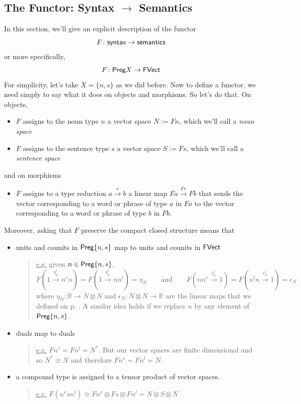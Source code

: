 \documentclass{tufte-handout-tai}
\newcommand{\cat}[1]{{\normalfont\textsf{#1}}}
\theoremstyle{plain}
\theoremstyle{definition}
\theoremstyle{remark}
\begin{document}
\subsection*{The Functor: Syntax $\to$ Semantics} 
In this section, we'll give an explicit description of the functor
\[F\colon \cat{syntax}\to\cat{semantics}\]
or more specifically,
\[F\colon \cat{Preg}X\to\cat{FVect}\]
For simplicity, let's take $X=\{n,s\}$ as we did before. Now to define a functor, we need simply to say what it does on objects and morphisms. So let's do that. On objects, 
		\begin{itemize}
			\item $F$ assigns to the noun type $n$ a vector space $N:=Fn$, which we'll call a \textit{noun space}
			\item $F$ assigns to the sentence type $s$ a vector space $S:=Fs$, which we'll call a \textit{sentence space}
		\end{itemize}
and on morphisms
		\begin{itemize}
			\item $F$ assigns to a type reduction $a\overset{r}{\longrightarrow} b$ a linear map $Fa\overset{Fr}{\longrightarrow}Fb$ that sends the vector corresponding to a word or phrase of type $a$ in $Fa$ to the vector corresponding to a word or phrase of type $b$ in $Fb$.
		\end{itemize}
Moreover, asking that $F$ preserve the compact closed structure means that
	\begin{itemize}
		\item units and counits in $\cat{Preg}\{n,s\}$ map to units and counits in $\cat{FVect}$
			
			\begin{quote}
				\underline{e.g.} given $n\in \cat{Preg}\{n,s\}$, 
				\[F(1\overset{\eta_n^r}{\longrightarrow} n^rn)=F(1\overset{\eta_n^l}{\longrightarrow} nn^l)=\eta_N 
				\qquad\text{and}\qquad
				F(nn^r\overset{\epsilon_n^r}{\longrightarrow}1)=F(n^ln\overset{\epsilon_n^l}{\longrightarrow}1)=\epsilon_N 
				\]
				where $\eta_N\colon \mathbb{R}\to N\otimes N$ and $\epsilon_N\colon N\otimes N\to \mathbb{R}$ are the linear maps that we defined on p. \pageref{lis:ucounit}. A similar idea holds if we replace $n$ by any element of $\cat{Preg}\{n,s\}$.
			\end{quote}
			
		\item duals map to duals
			
			\begin{quote} 
				\underline{e.g.} $Fn^r=Fn^l=N^*$. But our vector spaces are finite dimensional and so $N^*\cong N$ and therefore $Fn^r=Fn^l=N$.
			\end{quote}
			
		\item a compound type is assigned to a tensor product of vector spaces. 
		
			\begin{quote}
				\underline{e.g.} $F(n^rsn^l)\cong Fn^r\otimes Fs\otimes Fn^l=N\otimes S\otimes N$
			\end{quote}
			
	\end{itemize}
\end{document}
